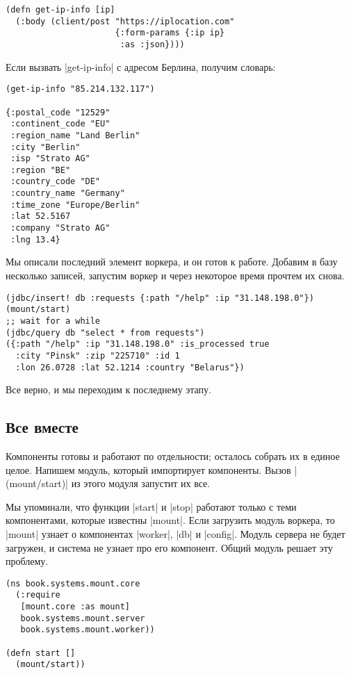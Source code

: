 \begin{verbatim}
(defn get-ip-info [ip]
  (:body (client/post "https://iplocation.com"
                      {:form-params {:ip ip}
                       :as :json})))
\end{verbatim}

Если вызвать \spverb|get-ip-info| с адресом Берлина, получим словарь:

\begin{verbatim}
(get-ip-info "85.214.132.117")

{:postal_code "12529"
 :continent_code "EU"
 :region_name "Land Berlin"
 :city "Berlin"
 :isp "Strato AG"
 :region "BE"
 :country_code "DE"
 :country_name "Germany"
 :time_zone "Europe/Berlin"
 :lat 52.5167
 :company "Strato AG"
 :lng 13.4}
\end{verbatim}

Мы описали последний элемент воркера, и он готов к работе. Добавим в базу
несколько записей, запустим воркер и через некоторое время прочтем их снова.

\begin{verbatim}
(jdbc/insert! db :requests {:path "/help" :ip "31.148.198.0"})
(mount/start)
;; wait for a while
(jdbc/query db "select * from requests")
({:path "/help" :ip "31.148.198.0" :is_processed true
  :city "Pinsk" :zip "225710" :id 1
  :lon 26.0728 :lat 52.1214 :country "Belarus"})
\end{verbatim}

Все верно, и мы переходим к последнему этапу.

\subsection{Все вместе}

Компоненты готовы и работают по отдельности; осталось собрать их в единое
целое. Напишем модуль, который импортирует компоненты. Вызов
\spverb|(mount/start)| из этого модуля запустит их все.

Мы упоминали, что функции \spverb|start| и \spverb|stop| работают только с теми
компонентами, которые известны \spverb|mount|. Если загрузить модуль воркера, то
\spverb|mount| узнает о компонентах \spverb|worker|, \spverb|db| и
\spverb|config|. Модуль сервера не будет загружен, и система не узнает про его
компонент. Общий модуль решает эту проблему.

\begin{verbatim}
(ns book.systems.mount.core
  (:require
   [mount.core :as mount]
   book.systems.mount.server
   book.systems.mount.worker))

(defn start []
  (mount/start))
\end{verbatim}

